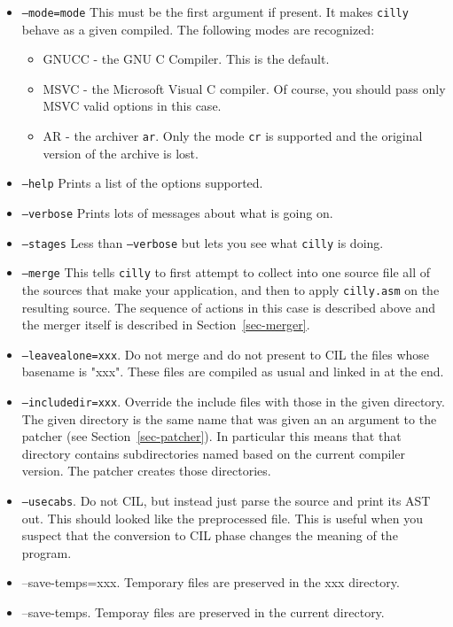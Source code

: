 \documentclass{article}
\def\secref#1{Section~\ref{sec-#1}}
\def\t#1{{\tt #1}}
\newcommand\codecolor{\ifhevea\blue\else\fi}
\renewcommand\c[1]{{\codecolor #1}} %
\begin{document}
\begin{itemize}
\item \t{--mode=mode} This must be the first argument if present. It makes
\t{cilly} behave as a given compiled. The following modes are recognized: 
     \begin{itemize}
        \item GNUCC - the GNU C Compiler. This is the default.
        \item MSVC - the Microsoft Visual C compiler. Of course, you should
                     pass only MSVC valid options in this case. 
        \item AR - the archiver \t{ar}. Only the mode \t{cr} is supported and
                   the original version of the archive is lost. 
     \end{itemize}
\item \t{--help} Prints a list of the options supported.
\item \t{--verbose} Prints lots of messages about what is going on.
\item \t{--stages} Less than \t{--verbose} but lets you see what \t{cilly}
                   is doing. 
\item \t{--merge} This tells \t{cilly} to first attempt to collect into one
source file all of the sources that make your application, and then to apply
\t{cilly.asm} on the resulting source. The sequence of actions in this case is
described above and the merger itself is described in \secref{merger}.

\item \t{--leavealone=xxx}. Do not merge and do not present to CIL the files
whose basename is "xxx". These files are compiled as usual and linked in at
the end. 
\item \t{--includedir=xxx}. Override the include files with those in the given
directory. The given directory is the same name that was given an an argument
to the patcher (see \secref{patcher}). In particular this means that
that directory contains subdirectories named based on the current compiler
version. The patcher creates those directories. 
\item \t{--usecabs}. Do not CIL, but instead just parse the source and print
its AST out. This should looked like the preprocessed file. This is useful
when you suspect that the conversion to CIL phase changes the meaning of the
program. 
\item \c{--save-temps=xxx}. Temporary files are preserved in the xxx directory.
\item \c{--save-temps}. Temporay files are preserved in the current directory.
\end{itemize}
 
\end{document}
